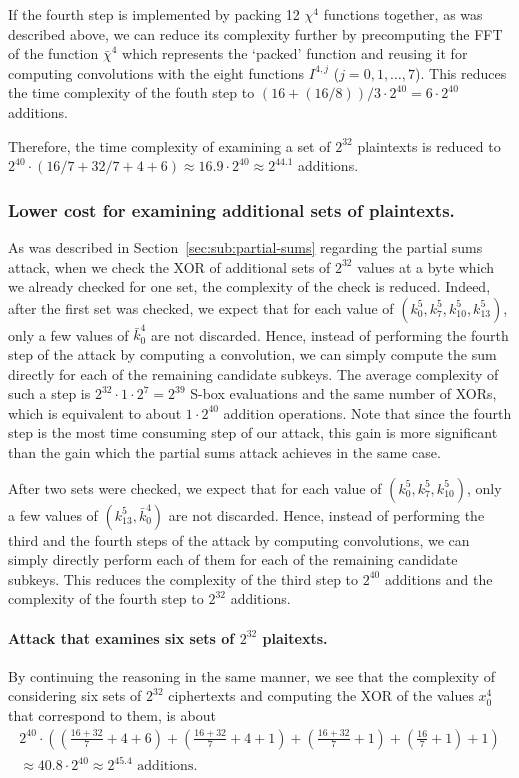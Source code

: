 If the fourth step is implemented by packing 12 $\chi^4$ functions together, as was described above, we can reduce its complexity further by precomputing the FFT of the function $\bar{\chi}^4$ which represents the `packed' function and reusing it for computing convolutions with the eight functions $I^{4,j}$ ($j=0,1,\ldots,7$). This reduces the time complexity of the fouth step to $(16+(16/8))/3 \cdot 2^{40} = 6 \cdot 2^{40}$ additions.

Therefore, the time complexity of examining a set of $2^{32}$ plaintexts is reduced to $2^{40} \cdot (16/7+32/7+4+6) \approx 16.9 \cdot 2^{40} \approx 2^{44.1}$ additions. 

\subsubsection{Lower cost for examining additional sets of plaintexts.} As was described in Section~\ref{sec:sub:partial-sums} regarding the partial sums attack, when we check the XOR of additional sets of $2^{32}$ values at a byte which we already checked for one set, the complexity of the check is reduced. Indeed, after the first set was checked, we expect that for each value of $(k^5_0,k^5_7,k^5_{10},k^5_{13})$, only a few values of $\bar{k}^4_0$ are not discarded. Hence, instead of performing the fourth step of the attack by computing a convolution, we can simply compute the sum directly for each of the remaining candidate subkeys. The average complexity of such a step is $2^{32} \cdot 1 \cdot 2^{7}=2^{39}$ S-box evaluations and the same number of XORs, which is equivalent to about $1 \cdot 2^{40}$ addition operations. Note that since the fourth step is the most time consuming step of our attack, this gain is more significant than the gain which the partial sums attack achieves in the same case.

After two sets were checked, we expect that for each value of $(k^5_0,k^5_7,k^5_{10})$, only a few values of $(k^5_{13},\bar{k}^4_0)$ are not discarded. Hence, instead of performing the third and the fourth steps of the attack by computing convolutions, we can simply directly perform each of them for each of the remaining candidate subkeys. This reduces the complexity of the third step to $2^{40}$ additions and the complexity of the fourth step to $2^{32}$ additions.

\paragraph{Attack that examines six sets of $2^{32}$ plaitexts.} By continuing the reasoning in the same manner, we see that the complexity of considering six sets of $2^{32}$ ciphertexts and computing the XOR of the values $x^4_0$ that correspond to them, is about
\[
\begin{gathered}
2^{40}\cdot\left(\left(\frac{16+32}{7}+4+6\right)+\left(\frac{16+32}{7}+4+1\right)+\left(\frac{16+32}{7}+1\right)+\left(\frac{16}{7}+1\right)+1\right) \\ \approx 40.8 \cdot 2^{40} \approx 2^{45.4} \text{ additions.} 
\end{gathered}
\]


